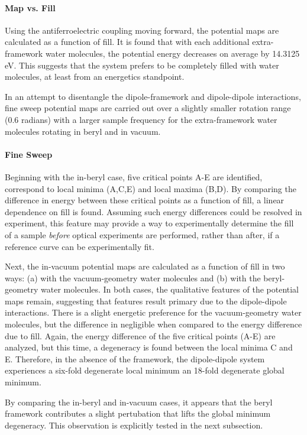 \paragraph{Map vs. Fill} Using the antiferroelectric coupling moving forward, the potential maps are calculated as a function of fill. It is found that with each additional extra-framework water molecules, the potential energy decreases on average by 14.3125 eV. This suggests that the system prefers to be completely filled with water molecules, at least from an energetics standpoint. 

In an attempt to disentangle the dipole-framework and dipole-dipole interactions, fine sweep potential maps are carried out over a slightly smaller rotation range (0.6 radians) with a larger sample frequency for the extra-framework water molecules rotating in beryl and in vacuum.

\paragraph{Fine Sweep} Beginning with the in-beryl case, five critical points A-E are identified, correspond to local minima (A,C,E) and local maxima (B,D). By comparing the difference in energy between these critical points as a function of fill, a linear dependence on fill is found. Assuming such energy differences could be resolved in experiment, this feature may provide a way to experimentally determine the fill of a sample \textit{before} optical experiments are performed, rather than after, if a reference curve can be experimentally fit. 

Next, the in-vacuum potential maps are calculated as a function of fill in two ways: (a) with the vacuum-geometry water molecules and (b) with the beryl-geometry water molecules. In both cases, the qualitative features of the potential maps remain, suggesting that features result primary due to the dipole-dipole interactions. There is a slight energetic preference for the vacuum-geometry water molecules, but the difference in negligible when compared to the energy difference due to fill. Again, the energy difference of the five critical points (A-E) are analyzed, but this time, a degeneracy is found between the local minima C and E. Therefore, in the absence of the framework, the dipole-dipole system experiences a six-fold degenerate local minimum an 18-fold degenerate global minimum. 

By comparing the in-beryl and in-vacuum cases, it appears that the beryl framework contributes a slight pertubation that lifts the global minimum degeneracy. This observation is explicitly tested in the next subsection. 

